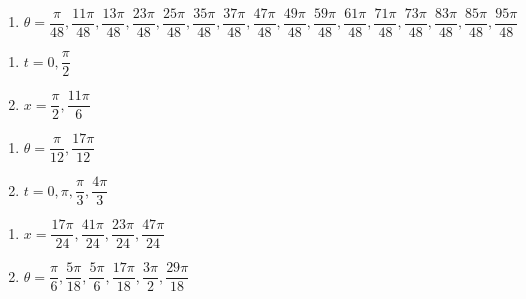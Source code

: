 \documentclass{ximera}
\begin{document}
\begin{enumerate}

\setcounter{enumi}{\value{HW}}

\item $\theta = \dfrac{\pi}{48}, \dfrac{11\pi}{48}, \dfrac{13\pi}{48}, \dfrac{23\pi}{48}, \dfrac{25\pi}{48}, \dfrac{35\pi}{48}, \dfrac{37\pi}{48}, \dfrac{47\pi}{48}, \dfrac{49\pi}{48}, \dfrac{59\pi}{48}, \dfrac{61\pi}{48}, \dfrac{71\pi}{48}, \dfrac{73\pi}{48}, \dfrac{83\pi}{48}, \dfrac{85\pi}{48}, \dfrac{95\pi}{48}$

\setcounter{HW}{\value{enumi}}

\end{enumerate}

\begin{multicols}{2}

\begin{enumerate}

\setcounter{enumi}{\value{HW}}

\item $t = 0, \dfrac{\pi}{2}$ 
\item  $x = \dfrac{\pi}{2}, \dfrac{11\pi}{6}$

\setcounter{HW}{\value{enumi}}

\end{enumerate}

\end{multicols}

\begin{multicols}{2}

\begin{enumerate}

\setcounter{enumi}{\value{HW}}

\item  $\theta = \dfrac{\pi}{12}, \dfrac{17\pi}{12}$
\item  $t = 0, \pi, \dfrac{\pi}{3}, \dfrac{4\pi}{3}$

\setcounter{HW}{\value{enumi}}

\end{enumerate}

\end{multicols}

\begin{multicols}{2}

\begin{enumerate}

\setcounter{enumi}{\value{HW}}

\item  $x = \dfrac{17 \pi}{24}, \dfrac{41 \pi}{24}, \dfrac{23\pi}{24}, \dfrac{47\pi}{24}$
\item $\theta = \dfrac{\pi}{6}, \dfrac{5\pi}{18}, \dfrac{5\pi}{6}, \dfrac{17\pi}{18}, \dfrac{3\pi}{2}, \dfrac{29\pi}{18}$

\setcounter{HW}{\value{enumi}}

\end{enumerate}

\end{multicols}
\end{document}
